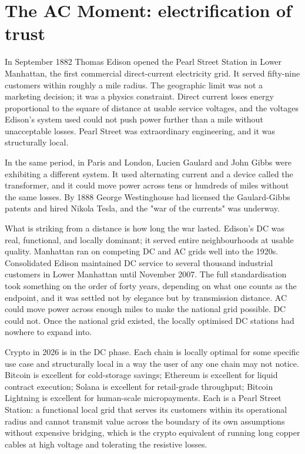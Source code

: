 \documentclass[11pt,a4paper]{article}
\begin{document}
\section{The AC Moment: electrification of trust}\label{sec:ac}

In September 1882 Thomas Edison opened the Pearl Street Station in Lower
Manhattan, the first commercial direct-current electricity grid. It
served fifty-nine customers within roughly a mile radius. The geographic
limit was not a marketing decision; it was a physics constraint. Direct
current loses energy proportional to the square of distance at usable
service voltages, and the voltages Edison's system used could not push
power further than a mile without unacceptable losses. Pearl Street was
extraordinary engineering, and it was structurally local.

In the same period, in Paris and London, Lucien Gaulard and John Gibbs
were exhibiting a different system. It used alternating current and a
device called the transformer, and it could move power across tens or
hundreds of miles without the same losses. By 1888 George Westinghouse
had licensed the Gaulard-Gibbs patents and hired Nikola Tesla, and the
"war of the currents" was underway.

What is striking from a distance is how long the war lasted. Edison's DC
was real, functional, and locally dominant; it served entire
neighbourhoods at usable quality. Manhattan ran on competing DC and AC
grids well into the 1920s. Consolidated Edison maintained DC service to
several thousand industrial customers in Lower Manhattan until November
2007. The full standardisation took something on the order of forty
years, depending on what one counts as the endpoint, and it was settled
not by elegance but by transmission distance. AC could move power across
enough miles to make the national grid possible. DC could not. Once the
national grid existed, the locally optimised DC stations had nowhere to
expand into.

Crypto in 2026 is in the DC phase. Each chain is locally optimal for some
specific use case and structurally local in a way the user of any one
chain may not notice. Bitcoin is excellent for cold-storage savings;
Ethereum is excellent for liquid contract execution; Solana is excellent
for retail-grade throughput; Bitcoin Lightning is excellent for
human-scale micropayments. Each is a Pearl Street Station: a functional
local grid that serves its customers within its operational radius and
cannot transmit value across the boundary of its own assumptions without
expensive bridging, which is the crypto equivalent of running long
copper cables at high voltage and tolerating the resistive losses.
\end{document}
